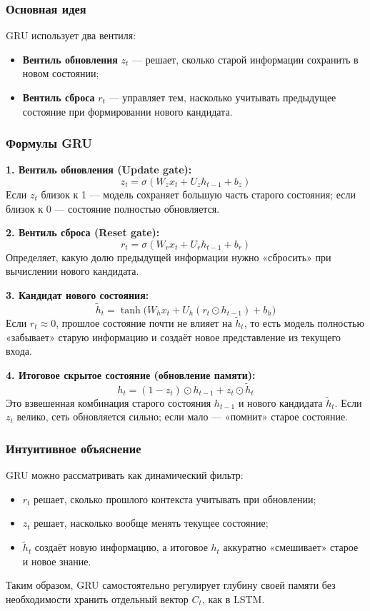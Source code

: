 \documentclass[12pt,a4paper]{article}
\begin{document}
\subsubsection*{Основная идея}
GRU использует два вентиля:
\begin{itemize}
  \item \textbf{Вентиль обновления} \( z_t \) — решает, сколько старой информации сохранить в новом состоянии;
  \item \textbf{Вентиль сброса} \( r_t \) — управляет тем, насколько учитывать предыдущее состояние при формировании нового кандидата.
\end{itemize}


\subsubsection*{Формулы GRU}

\textbf{1. Вентиль обновления (Update gate):}
\[
z_t = \sigma(W_z x_t + U_z h_{t-1} + b_z)
\]
Если \( z_t \) близок к 1 — модель сохраняет большую часть старого состояния; если близок к 0 — состояние полностью обновляется.

\textbf{2. Вентиль сброса (Reset gate):}
\[
r_t = \sigma(W_r x_t + U_r h_{t-1} + b_r)
\]
Определяет, какую долю предыдущей информации нужно «сбросить» при вычислении нового кандидата.

\textbf{3. Кандидат нового состояния:}
\[
\tilde{h}_t = \tanh\!\bigl(W_h x_t + U_h (r_t \odot h_{t-1}) + b_h\bigr)
\]
Если \(r_t \approx 0\), прошлое состояние почти не влияет на \(\tilde{h}_t\), то есть модель полностью «забывает» старую информацию и создаёт новое представление из текущего входа.

\textbf{4. Итоговое скрытое состояние (обновление памяти):}
\[
h_t = (1 - z_t) \odot h_{t-1} + z_t \odot \tilde{h}_t
\]
Это взвешенная комбинация старого состояния \(h_{t-1}\) и нового кандидата \(\tilde{h}_t\).
Если \(z_t\) велико, сеть обновляется сильно; если мало — «помнит» старое состояние.


\subsubsection*{Интуитивное объяснение}
GRU можно рассматривать как динамический фильтр:
\begin{itemize}
  \item \(r_t\) решает, сколько прошлого контекста учитывать при обновлении;
  \item \(z_t\) решает, насколько вообще менять текущее состояние;
  \item \(\tilde{h}_t\) создаёт новую информацию, а итоговое \(h_t\) аккуратно «смешивает» старое и новое знание.
\end{itemize}
Таким образом, GRU самостоятельно регулирует глубину своей памяти без необходимости хранить отдельный вектор \( C_t \), как в LSTM.
\end{document}
